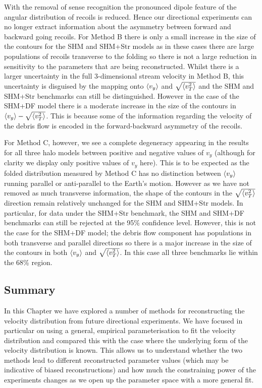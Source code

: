 With the removal of sense recognition the pronounced dipole feature of the angular distribution of recoils is reduced. Hence our directional experiments can no longer extract information about the asymmetry between forward and backward going recoils. For Method B there is only a small increase in the size of the contours for the SHM and SHM+Str models as in these cases there are large populations of recoils transverse to the folding so there is not a large reduction in sensitivity to the parameters that are being reconstructed. Whilst there is a larger uncertainty in the full 3-dimensional stream velocity in Method B, this uncertainty is disguised by the mapping onto $\langle v_y \rangle$ and $\sqrt{\langle v_T^2 \rangle}$ and the SHM and SHM+Str benchmarks can still be distinguished. However in the case of the SHM+DF model there is a moderate increase in the size of the contours in $\langle v_y \rangle-\sqrt{\langle v_T^2 \rangle}$. This is because some of the information regarding the velocity of the debris flow is encoded in the forward-backward asymmetry of the recoils.

For Method C, however, we see a complete degeneracy appearing in the results for all three halo models between positive and negative values of $v_y$ (although for clarity we display only positive values of $v_y$ here). This is to be expected as the folded distribution measured by Method C has no distinction between $\langle v_y \rangle$ running parallel or anti-parallel to the Earth's motion. However as we have not removed as much transverse information, the shape of the contours in the $\sqrt{\langle v_T^2 \rangle}$ direction remain relatively unchanged for the SHM and SHM+Str models. In particular, for data under the SHM+Str benchmark, the SHM and SHM+DF benchmarks can still be rejected at the 95\% confidence level. However, this is not the case for the SHM+DF model; the debris flow component has populations in both transverse and parallel directions so there is a major increase in the size of the contours in both $\langle v_y \rangle$ and $\sqrt{\langle v_T^2 \rangle}$. In this case all three benchmarks lie within the 68\% region.

\subsection{Summary}
In this Chapter we have explored a number of methods for reconstructing the velocity distribution from future directional experiments. We have focused in particular on using a general, empirical parameterisation to fit the velocity distribution and compared this with the case where the underlying form of the velocity distribution is known. This allows us to understand whether the two methods lead to different reconstructed parameter values (which may be indicative of biased reconstructions) and how much the constraining power of the experiments changes as we open up the parameter space with a more general fit.

